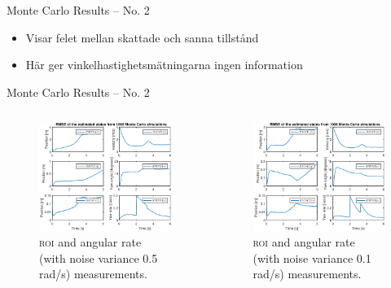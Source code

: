 \documentclass{beamer}
\newcommand{\roi}{\textsc{roi}\xspace}
\renewcommand{\a}{\r{a}\xspace}
\renewcommand{\aa}{\"a\xspace}
\begin{document}
\begin{frame}{Monte Carlo Results -- No. 2}
	\note
	{
		\begin{itemize}
			\item Visar felet mellan skattade och sanna tillst\a{}nd
			\item H\aa{}r ger vinkelhastighetsm\aa{}tningarna ingen information
		\end{itemize}
	}
\end{frame}

\begin{frame}{Monte Carlo Results -- No. 2}
	\begin{columns}[T]
	\begin{figure}
		\includegraphics[width=\textwidth]{MC/24_MC_1000_Rmse}
		\caption{\roi and angular rate (with noise variance 0.5 rad/s) measurements.}
	\end{figure}
	\begin{figure}
		\includegraphics[width=\textwidth]{MC/23_MC_1000_Rmse}
		\caption{\roi and angular rate (with noise variance 0.1 rad/s) measurements.}
	\end{figure}
	\end{columns}


\end{frame}
\end{document}
